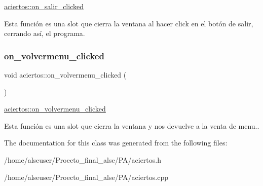 \hyperlink{classaciertos_a1b36eb2a2c3fef95390943d8dacf915d}{aciertos\+::on\+\_\+salir\+\_\+clicked} 

Esta función es una slot que cierra la ventana al hacer click en el botón de salir, cerrando así, el programa. \mbox{\label{classaciertos_aae3c1efb76360acfff0e058b6ba6ec33}} 
\subsubsection{\texorpdfstring{on\+\_\+volvermenu\+\_\+clicked}{on\_volvermenu\_clicked}}
{\footnotesize\ttfamily void aciertos\+::on\+\_\+volvermenu\+\_\+clicked (\begin{DoxyParamCaption}{ }\end{DoxyParamCaption})\hspace{0.3cm}{\ttfamily [slot]}}



\hyperlink{classaciertos_aae3c1efb76360acfff0e058b6ba6ec33}{aciertos\+::on\+\_\+volvermenu\+\_\+clicked} 

Esta función es una slot que cierra la ventana y nos devuelve a la venta de menu.. 

The documentation for this class was generated from the following files\+:\begin{DoxyCompactItemize}
\item 
/home/alseuser/\+Proecto\+\_\+final\+\_\+alse/\+P\+A/aciertos.\+h\item 
/home/alseuser/\+Proecto\+\_\+final\+\_\+alse/\+P\+A/aciertos.\+cpp\end{DoxyCompactItemize}
